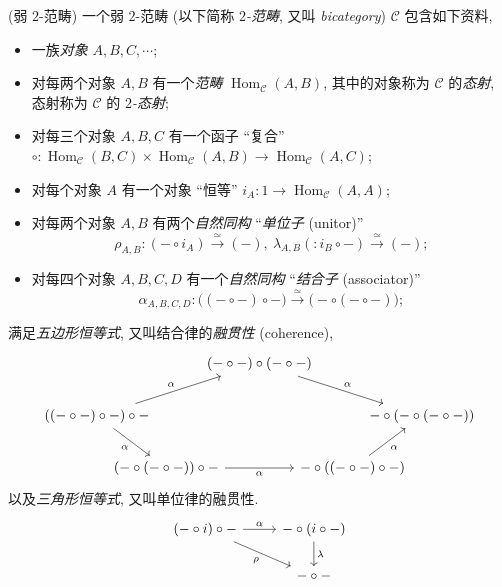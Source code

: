 \begin{definition}
	{(弱 $2$-范畴)}
	一个弱 $2$-范畴 (以下简称 \emph{$2$-范畴}, 又叫 \emph{bicategory}) $\mathcal C$ 包含如下资料,
	\begin{itemize}
		\item 一族\emph{对象} $A,B,C,\cdots$;
		\item 对每两个对象 $A,B$ 有一个\emph{范畴} $\operatorname{Hom}_{\mathcal C}(A,B)$, 其中的对象称为 $\mathcal C$ 的\emph{态射}, 态射称为 $\mathcal C$ 的 \emph{$2$-态射};
		\item 对每三个对象 $A,B,C$ 有一个函子 ``复合'' $\circ\colon \operatorname{Hom}_{\mathcal C}(B,C)\times \operatorname{Hom}_{\mathcal C}(A,B) \to \operatorname{Hom}_{\mathcal C}(A,C)$;
		\item 对每个对象 $A$ 有一个对象 ``恒等'' $i_A\colon 1\to \operatorname{Hom}_{\mathcal C}(A,A)$;
		\item 对每两个对象 $A,B$ 有两个\emph{自然同构} ``\emph{单位子} (unitor)''
		$$\rho_{A,B}\colon (-\circ i_A)  \overset{\simeq}{\to}  (-),\ 
		\lambda_{A,B} (\colon i_B\circ -) \overset{\simeq}{\to}  (-);$$
		\item 对每四个对象 $A,B,C,D$ 有一个\emph{自然同构} ``\emph{结合子} (associator)''
		$$\alpha_{A,B,C,D}\colon \big((-\circ -) \circ {-}\big) \overset{\simeq}{\to} \big({-}\circ (- \circ -)\big);$$%
	\end{itemize}
	满足\emph{五边形恒等式}, 又叫结合律的\emph{融贯性} (coherence),
	\[\begin{tikzcd}[ampersand replacement=\&,column sep=-1.7em,row sep=2em]
		\&\&\& {(-\circ -)\circ(-\circ -)} \\
		{((-\circ -)\circ -)\circ -} \&\&\&\&\&\& {-\circ(-\circ(-\circ -))} \\
		\&\& {(-\circ (-\circ -))\circ -} \&\& {-\circ((-\circ -)\circ -)}
		\arrow["\alpha", from=2-1, to=1-4]
		\arrow["\alpha"', from=2-1, to=3-3]
		\arrow["\alpha"', from=3-3, to=3-5]
		\arrow["\alpha", from=1-4, to=2-7]
		\arrow["\alpha"', from=3-5, to=2-7]
	\end{tikzcd}\]
	以及\emph{三角形恒等式}, 又叫单位律的融贯性.
	\[\begin{tikzcd}[ampersand replacement=\&]
		{(-\circ i)\circ -} \& {-\circ (i\circ -)} \\
		\& -\circ -
		\arrow["\alpha", from=1-1, to=1-2]
		\arrow["\rho"', from=1-1, to=2-2]
		\arrow["\lambda", from=1-2, to=2-2]
	\end{tikzcd}\]
\end{definition}

